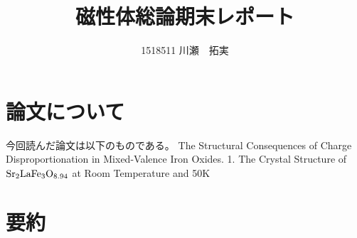 \documentclass{jsarticle}
\begin{document}
\title{磁性体総論期末レポート}
\author{1518511 川瀬　拓実}
\maketitle

\newpage

\section{論文について}
今回読んだ論文は以下のものである。
The Structural Consequences of Charge Disproportionation in Mixed-Valence Iron Oxides. 1. The Crystal Structure of $\rm{Sr_{2}LaFe_{3}O_{8.94}}$ at Room Temperature and 50K

\section{要約}
\end{document}
